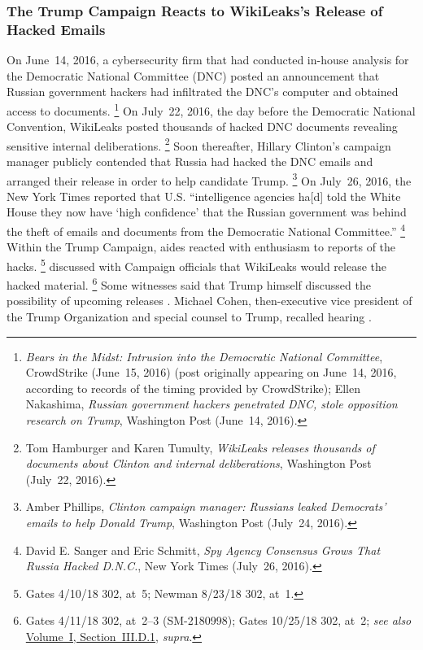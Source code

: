 \subsubsection{The Trump Campaign Reacts to WikiLeaks's Release of Hacked Emails}
On June~14, 2016, a cybersecurity firm that had conducted in-house analysis for the Democratic National Committee (DNC) posted an announcement that Russian government hackers had infiltrated the DNC's computer and obtained access to documents.%
\footnote{\textit{Bears in the Midst: Intrusion into the Democratic National Committee}, CrowdStrike (June~15, 2016) (post originally appearing on June~14, 2016, according to records of the timing provided by CrowdStrike);
Ellen Nakashima, \textit{Russian government hackers penetrated DNC, stole opposition research on Trump}, Washington Post (June~14, 2016).}
On July~22, 2016, the day before the Democratic National Convention, WikiLeaks posted thousands of hacked DNC documents revealing sensitive internal deliberations.%
\footnote{Tom Hamburger and Karen Tumulty, \textit{WikiLeaks releases thousands of documents about Clinton and internal deliberations}, Washington Post (July~22, 2016).}
Soon thereafter, Hillary Clinton's campaign manager publicly contended that Russia had hacked the DNC emails and arranged their release in order to help candidate Trump.%
\footnote{Amber Phillips, \textit{Clinton campaign manager: Russians leaked Democrats' emails to help Donald Trump}, Washington Post (July~24, 2016).}
On July~26, 2016, the New York Times reported that U.S. ``intelligence agencies ha[d] told the White House they now have `high confidence' that the Russian government was behind the theft of emails and documents from the Democratic National Committee.''%
\footnote{David E. Sanger and Eric Schmitt, \textit{Spy Agency Consensus Grows That Russia Hacked D.N.C.}, New York Times (July~26, 2016).}
Within the Trump Campaign, aides reacted with enthusiasm to reports of the hacks.%
\footnote{Gates 4/10/18 302, at~5;
Newman 8/23/18 302, at~1.}
 discussed with Campaign officials that WikiLeaks would release the hacked material.%
\footnote{Gates 4/11/18 302, at~2--3 (SM-2180998);
Gates 10/25/18 302, at~2;
\textit{see also} \hyperlink{subsubsection.1.3.4.1}{Volume~I, Section~III.D.1}, \textit{supra}.}
Some witnesses said that Trump himself discussed the possibility of upcoming releases .
Michael Cohen, then-executive vice president of the Trump Organization and special counsel to Trump, recalled hearing .%
